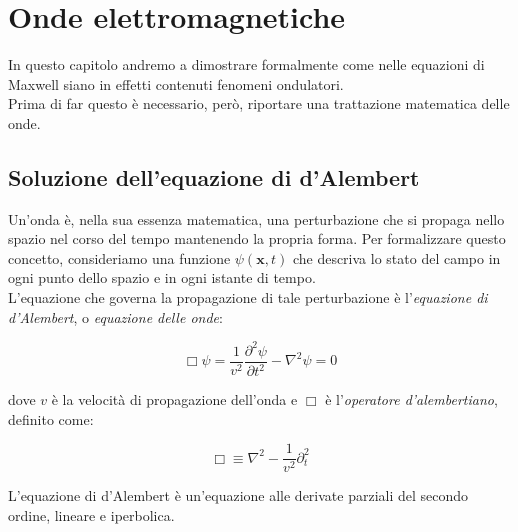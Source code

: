 \chapter{Onde elettromagnetiche}

In questo capitolo andremo a dimostrare formalmente come nelle equazioni di Maxwell siano in effetti contenuti fenomeni ondulatori.\\

Prima di far questo è necessario, però, riportare una trattazione matematica delle onde.

\section{Soluzione dell'equazione di d'Alembert}

Un'onda è, nella sua essenza matematica, una perturbazione che si propaga  nello spazio nel corso del tempo mantenendo la propria forma. 
Per formalizzare questo concetto, consideriamo una funzione  $\psi(\mathbf{x}, t)$ che descriva lo stato del campo in ogni punto  dello spazio e in ogni istante di tempo.\\

L'equazione che governa la propagazione di tale perturbazione è l'\emph{equazione di d'Alembert}, o \emph{equazione delle onde}: 

\begin{tcolorbox}[colback=yellow!10!white, colframe=orange!70!black, boxrule=0.8pt]
\begin{equation}
    \Box \psi = \frac{1}{v^2}\frac{\partial^2 \psi}{\partial t^2} 
    - \nabla^2 \psi = 0
    \label{eq:dalembert}
\end{equation}
\end{tcolorbox}

dove $v$ è la velocità di propagazione dell'onda e $\Box$ è l'\emph{operatore d'alembertiano}, definito come: 

\begin{tcolorbox}[colback=yellow!10!white, colframe=orange!70!black, boxrule=0.8pt]
\begin{equation}
    \Box \equiv \nabla^2 - \frac{1}{v^2} \partial_t ^2
\end{equation}
\end{tcolorbox}

L'equazione di d'Alembert è un'equazione alle derivate parziali del secondo ordine, lineare e iperbolica.\\

